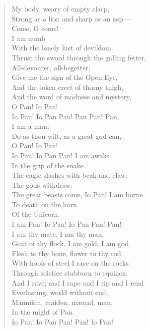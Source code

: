 \begin{verse}
My body, weary of empty clasp, \\
Strong as a lion and sharp as an asp --- \\
Come, O come! \\
I am numb \\
With the lonely lust of devildom. \\
Thrust the sword through the galling fetter, \\
All-devourer, all-begetter; \\
Give me the sign of the Open Eye, \\
And the token erect of thorny thigh, \\
And the word of madness and mystery, \\
O Pan! Io Pan! \\
Io Pan! Io Pan Pan! Pan Pan! Pan, \\
I am a man: \\
Do as thou wilt, as a great god can, \\
O Pan! Io Pan! \\
Io Pan! Io Pan Pan! I am awake \\
In the grip of the snake. \\
The eagle slashes with beak and claw; \\
The gods withdraw: \\
The great beasts come, Io Pan! I am borne \\
To death on the horn \\
Of the Unicorn. \\
I am Pan! Io Pan! Io Pan Pan! Pan! \\
I am thy mate, I am thy man, \\
Goat of thy flock, I am gold, I am god, \\
Flesh to thy bone, flower to thy rod. \\
With hoofs of steel I race on the rocks \\
Through solstice stubborn to equinox. \\
And I rave; and I rape and I rip and I rend \\
Everlasting, world without end, \\
Mannikin, maiden, m\ae{}nad, man, \\
In the might of Pan. \\
Io Pan! Io Pan Pan! Pan! Io Pan!
\end{verse}
